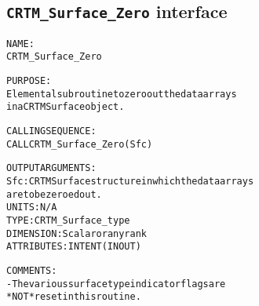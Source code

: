 \subsection{\texttt{CRTM\_Surface\_Zero} interface}
  \label{sec:CRTM_Surface_Zero_interface}
  \begin{alltt}
 
  NAME:
        CRTM_Surface_Zero
  
  PURPOSE:
        Elemental subroutine to zero out the data arrays
        in a CRTM Surface object.
 
  CALLING SEQUENCE:
        CALL CRTM_Surface_Zero( Sfc )
 
  OUTPUT ARGUMENTS:
        Sfc:          CRTM Surface structure in which the data arrays
                      are to be zeroed out.
                      UNITS:      N/A
                      TYPE:       CRTM_Surface_type
                      DIMENSION:  Scalar or any rank
                      ATTRIBUTES: INTENT(IN OUT)
 
  COMMENTS:
        - The various surface type indicator flags are
          *NOT* reset in this routine.
 
  \end{alltt}
